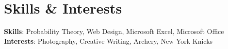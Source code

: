 \documentclass[letterpaper,11pt]{article}
\makeatletter
\newcommand{\resumeItem}[1]{
  \item\small{
    {#1 \vspace{-2pt}}
  }
}
\newcommand{\resumeSubheading}[4]{
  \vspace{-2pt}\item
    \begin{tabular*}{0.97\textwidth}[t]{l@{\extracolsep{\fill}}r}
      \textbf{#1} & #2 \\
      \textit{\small#3} & \textit{\small #4} \\
    \end{tabular*}\vspace{-7pt}
}
\newcommand{\resumeSubHeadingListStart}{\begin{itemize}[leftmargin=0.15in, label={}]}
\newcommand{\resumeSubHeadingListEnd}{\end{itemize}}
\newcommand{\resumeItemListStart}{\begin{itemize}}
\newcommand{\resumeItemListEnd}{\end{itemize}\vspace{-5pt}}
\makeatother
\begin{document}
  
  \section{Skills \& Interests}
   \begin{itemize}[leftmargin=0.15in, label={}]
      \small{\item{
      \vspace{1mm}
       \textbf{Skills}{: Probability Theory, Web Design, Microsoft Excel, Microsoft Office} \\
       \vspace{1mm}
       \textbf{Interests}{: Photography, Creative Writing, Archery, New York Knicks} \\
       \vspace{1mm}
  
      }}
  
   \end{itemize}

      

\end{document}
